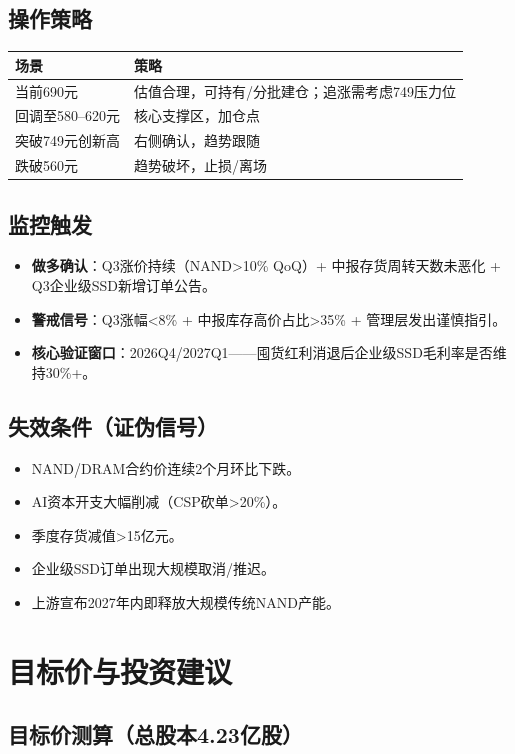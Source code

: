 \documentclass[a4paper,11pt,fontset=none]{ctexart}
\begin{document}
\subsection*{操作策略}
\begin{tabularx}{\textwidth}{L{3cm}X}
\toprule
\textbf{场景} & \textbf{策略} \\
\midrule
当前690元 & 估值合理，可持有/分批建仓；追涨需考虑749压力位 \\
回调至580--620元 & 核心支撑区，加仓点 \\
突破749元创新高 & 右侧确认，趋势跟随 \\
跌破560元 & 趋势破坏，止损/离场 \\
\bottomrule
\end{tabularx}

\subsection*{监控触发}
\begin{itemize}
  \item \textbf{做多确认}：Q3涨价持续（NAND>10\% QoQ）+ 中报存货周转天数未恶化 + Q3企业级SSD新增订单公告。
  \item \textbf{警戒信号}：Q3涨幅<8\% + 中报库存高价占比>35\% + 管理层发出谨慎指引。
  \item \textbf{核心验证窗口}：2026Q4/2027Q1——囤货红利消退后企业级SSD毛利率是否维持30\%+。
\end{itemize}

\subsection*{失效条件（证伪信号）}
\begin{itemize}
  \item NAND/DRAM合约价连续2个月环比下跌。
  \item AI资本开支大幅削减（CSP砍单>20\%）。
  \item 季度存货减值>15亿元。
  \item 企业级SSD订单出现大规模取消/推迟。
  \item 上游宣布2027年内即释放大规模传统NAND产能。
\end{itemize}

\section{目标价与投资建议}

\subsection*{目标价测算（总股本4.23亿股）}
\end{document}
